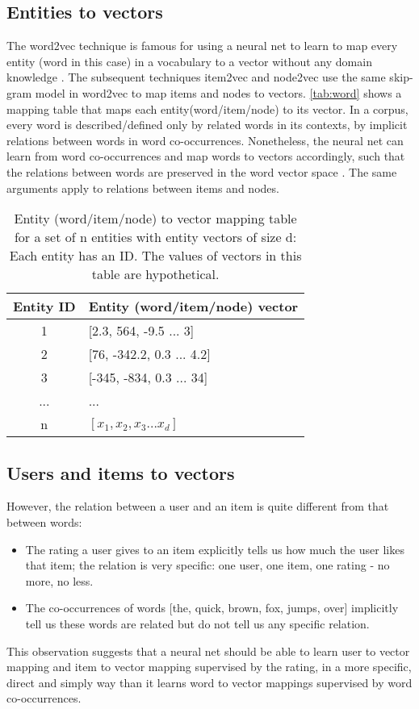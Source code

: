 \documentclass[letterpaper]{article}
\begin{document}
\subsection{Entities to vectors}
The word2vec technique is famous for using a neural net to learn to map every 
entity (word in this case) in a vocabulary to a vector without any domain 
knowledge \citeauthor{mikolov2013efficient}.
The subsequent techniques item2vec and node2vec use the same skip-gram 
model in word2vec to map items and nodes to vectors.
\autoref{tab:word} shows a mapping table that maps each entity(word/item/node) 
to its vector.
In a corpus, every word is described/defined only by related words in its 
contexts, by implicit relations between words in word co-occurrences.
Nonetheless, the neural net can learn from word co-occurrences and map words to 
vectors accordingly,
such that the relations between words are preserved in the word vector space 
\citeauthor{mikolov2013distributed}.
The same arguments apply to relations between items and nodes.
\begin{table}[!htb]
	\centering
	\caption{Entity (word/item/node) to vector mapping table for a set of n
		entities with entity vectors of size d:
		Each entity has an ID.
		The values of vectors in this table are hypothetical.
		}
	\begin{tabularx}{0.47\textwidth}{|c|X|} \hline \rowcolor{blue!50}
		Entity ID & Entity (word/item/node) vector \\ \hline
		1         & [2.3, 564, -9.5 ... 3] \\ \hline
		2         & [76, -342.2, 0.3 ... 4.2] \\ \hline
		3         & [-345, -834, 0.3 ... 34] \\ \hline
		...       & ... \\ \hline
		n         & $ [x_1, x_2, x_3 ... x_d] $ \\ \hline
	\end{tabularx}
	\label{tab:word}
\end{table}

\subsection{Users and items to vectors}
However, the relation between a user and an item is quite different from that 
between words:
\begin{itemize}
	\item The rating a user gives to an item explicitly tells us how much the 
	user likes that item;
	the relation is very specific: one user, one item, one rating - no more, no 
	less.
	\item The co-occurrences of words [the, quick, brown, fox, jumps, over] 
	implicitly tell us these words are related but do not tell us any specific 
	relation.
\end{itemize}
This observation suggests that a neural net should be able to learn user to 
vector mapping and item to vector mapping supervised by the rating, in a more 
specific, direct and simply way than it learns word to vector mappings 
supervised by word co-occurrences.
\end{document}
